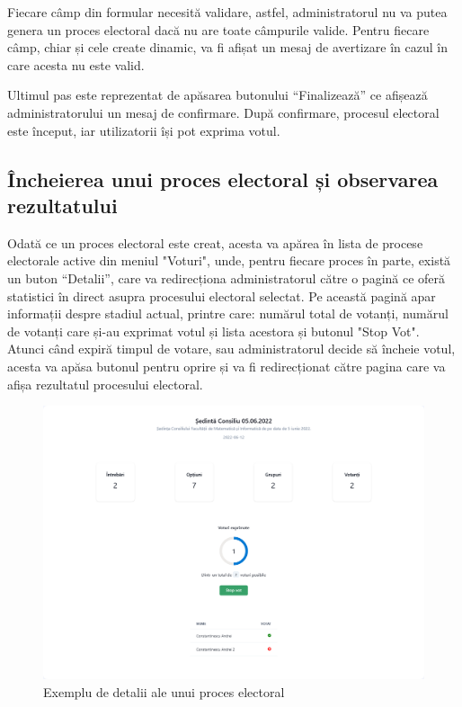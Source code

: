 Fiecare câmp din formular necesită validare, astfel, administratorul nu va putea genera un proces electoral dacă nu are toate câmpurile valide. Pentru fiecare câmp, chiar și cele create dinamic, va fi afișat un mesaj de avertizare în cazul în care acesta nu este valid.

Ultimul pas este reprezentat de apăsarea butonului \enquote{Finalizează} ce afișează administratorului un mesaj de confirmare. După confirmare, procesul electoral este început, iar utilizatorii își pot exprima votul.

\subsection{Încheierea unui proces electoral și observarea rezultatului}

Odată ce un proces electoral este creat, acesta va apărea în lista de procese electorale active din meniul "Voturi", unde, pentru fiecare proces în parte, există un buton \enquote{Detalii}, care va redirecționa administratorul către o pagină ce oferă statistici în direct asupra procesului electoral selectat. Pe această pagină apar informații despre stadiul actual, printre care: numărul total de votanți, numărul de votanți care și-au exprimat votul și lista acestora și butonul "Stop Vot". Atunci când expiră timpul de votare, sau administratorul decide să încheie votul, acesta va apăsa butonul pentru oprire și va fi redirecționat către pagina care va afișa rezultatul procesului electoral.

\begin{figure}[!ht]
    \centering
    \includegraphics[width=135mm]{images/example_vote_details.png}
    \caption{Exemplu de detalii ale unui proces electoral}
\end{figure}

